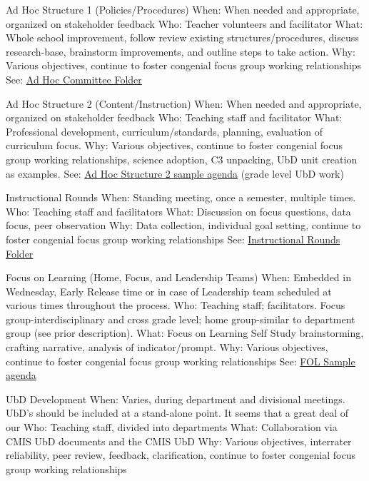 \begin{findings}
Ad Hoc Structure 1 (Policies/Procedures)
When: When needed and appropriate, organized on stakeholder feedback
Who: Teacher volunteers and facilitator
What: Whole school improvement, follow review existing structures/procedures, discuss research-base, brainstorm improvements, and outline steps to take action. 
Why: Various objectives, continue to foster congenial focus group working relationships
See: \href{https://drive.google.com/drive/folders/0ByVFfrm0zfolfjVOamtmQjRQSkRwV0cyX3prVnJaV3g4cHFkS1c5dkEtZE1idS12ZWpRcXc?usp=sharing}{Ad Hoc Committee Folder}

Ad Hoc Structure 2 (Content/Instruction)
When: When needed and appropriate, organized on stakeholder feedback 
Who: Teaching staff and facilitator 
What: Professional development, curriculum/standards, planning, evaluation of curriculum focus.
Why: Various objectives, continue to foster congenial focus group working relationships, science adoption, C3 unpacking,  UbD unit creation as examples. 
See: \href{https://docs.google.com/a/cmis.ac.th/document/d/1PWUPZmm2vR4IJ7SX3x5nhWWZvAfZ6Krz9QMHi78HCNA/edit?usp=sharing}{Ad Hoc Structure 2 sample agenda} (grade level UbD work)

Instructional Rounds 
When: Standing meeting, once a semester, multiple times. 
Who: Teaching staff and facilitators 
What: Discussion on focus questions, data focus, peer observation
Why: Data collection, individual goal setting, continue to foster congenial focus group working relationships
See: \href{https://drive.google.com/drive/folders/0ByVFfrm0zfolQ3FRNWNSVmpCUUk?usp=sharing}{Instructional Rounds Folder}

Focus on Learning (Home, Focus, and Leadership Teams)
When: Embedded in Wednesday, Early Release time or in case of Leadership team scheduled at various times throughout the process.
Who: Teaching staff; facilitators.  Focus group-interdisciplinary and cross grade level; home group-similar to department group (see prior description).
What: Focus on Learning Self Study brainstorming, crafting narrative, analysis of indicator/prompt.
Why: Various objectives, continue to foster congenial focus group working relationships
See: \href{https://docs.google.com/a/cmis.ac.th/document/d/16YqTcAhgTRg8LaIyVsV3moEB8PXdObg2IW2e_7fB3Fk/edit?usp=sharing}{FOL Sample agenda}

UbD Development
When: Varies, during department and divisional meetings. UbD’s should be included at a stand-alone point. It seems that a great deal of our 
Who: Teaching staff, divided into departments 
What: Collaboration via CMIS UbD documents and the CMIS UbD 
Why: Various objectives, interrater reliability, peer review, feedback, clarification, continue to foster congenial focus group working relationships


\end{findings}
